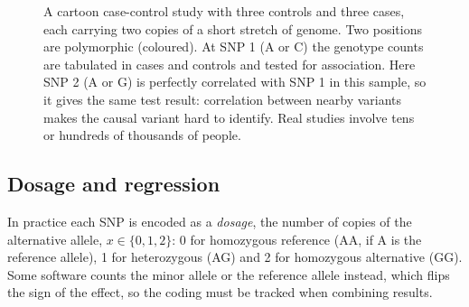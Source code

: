 \begin{figure}[!htbp]
  \caption{A cartoon case-control study with three controls and three cases, each carrying two copies of a short stretch of genome. Two positions are polymorphic (coloured). At SNP 1 (A or C) the genotype counts are tabulated in cases and controls and tested for association. Here SNP 2 (A or G) is perfectly correlated with SNP 1 in this sample, so it gives the same test result: correlation between nearby variants makes the causal variant hard to identify. Real studies involve tens or hundreds of thousands of people.}
  \label{fig:casecontrol}
\end{figure}

\subsection{Dosage and regression}

In practice each SNP is encoded as a \emph{dosage}, the number of copies of the alternative allele, $x\in\{0,1,2\}$: 0 for homozygous reference (AA, if A is the reference allele), 1 for heterozygous (AG) and 2 for homozygous alternative (GG). Some software counts the minor allele or the reference allele instead, which flips the sign of the effect, so the coding must be tracked when combining results.

